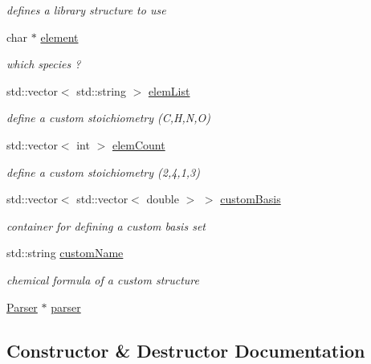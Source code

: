\begin{DoxyCompactItemize}
\begin{DoxyCompactList}\small\item\em defines a library structure to use \end{DoxyCompactList}\item 
char $\ast$ \hyperlink{class_reader_aad797cfb4296c19561d2729de8cd9333}{element}
\begin{DoxyCompactList}\small\item\em which species ? \end{DoxyCompactList}\item 
std\+::vector$<$ std\+::string $>$ \hyperlink{class_reader_a81df051804ba55004944e2d6f9a43cf7}{elem\+List}
\begin{DoxyCompactList}\small\item\em define a custom stoichiometry (C,H,N,O) \end{DoxyCompactList}\item 
std\+::vector$<$ int $>$ \hyperlink{class_reader_a81393d6441793db4fd62c7a4652518d3}{elem\+Count}
\begin{DoxyCompactList}\small\item\em define a custom stoichiometry (2,4,1,3) \end{DoxyCompactList}\item 
std\+::vector$<$ std\+::vector$<$ double $>$ $>$ \hyperlink{class_reader_a5f34996abadc7f998ffd1c34c4cfb380}{custom\+Basis}
\begin{DoxyCompactList}\small\item\em container for defining a custom basis set \end{DoxyCompactList}\item 
std\+::string \hyperlink{class_reader_a5cad9d6f8773e4ca9e6ae63b4dd7a307}{custom\+Name}
\begin{DoxyCompactList}\small\item\em chemical formula of a custom structure \end{DoxyCompactList}\item 
\hyperlink{class_parser}{Parser} $\ast$ \hyperlink{class_reader_a4a2ce1dccacd1cb00f0a226f4f78c9d6}{parser}
\end{DoxyCompactItemize}


\subsection{Constructor \& Destructor Documentation}
\hypertarget{class_reader_adcda31b507720ab44044d7a21686fba2}{}
